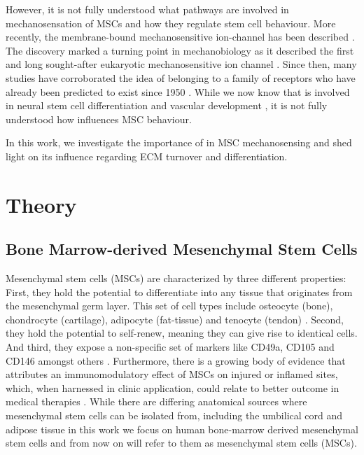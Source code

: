 However, it is not fully understood what pathways are involved in mechanosensation of MSCs and how they regulate stem cell behaviour. More recently, the membrane-bound mechanosensitive ion-channel \Piezo{} has been described \cite{Coste2010}. The discovery marked a turning point in mechanobiology as it described the first and long sought-after eukaryotic mechanosensitive ion channel \cite{Sharif-Naeini2015}. Since then, many studies have corroborated the idea of \Piezo{} belonging to a family of receptors who have already been predicted to exist since 1950 \cite{Katz1949}. While we now know that \Piezo{} is involved in neural stem cell differentiation \cite{Pathak2014} and vascular development \cite{Ranade2014}, it is not fully understood how \Piezo{} influences MSC behaviour. \par
In this work, we investigate the importance of \Piezo{} in MSC mechanosensing and shed light on its influence regarding ECM turnover and differentiation.

\section{Theory}

\subsection{Bone Marrow-derived Mesenchymal Stem Cells}

Mesenchymal stem cells (MSCs) are characterized by three different properties: First, they hold the potential to differentiate into any tissue that originates from the mesenchymal germ layer. This set of cell types include osteocyte (bone), chondrocyte (cartilage), adipocyte (fat-tissue) and tenocyte (tendon) \cite{Ng2008}. Second, they hold the potential to self-renew, meaning they can give rise to identical cells. And third, they expose a non-specific set of markers like CD49a, CD105 and CD146 amongst others \cite{Bianco2013}. Furthermore, there is a growing body of evidence that attributes an immunomodulatory effect of MSCs on injured or inflamed sites, which, when harnessed in clinic application, could relate to better outcome in medical therapies \cite{Caplan2011, Hass2011}.
While there are differing anatomical sources where mesenchymal stem cells can be isolated from, including the umbilical cord and adipose tissue \cite{Barlow2008, Hass2011} in this work we focus on human bone-marrow derived mesenchymal stem cells and from now on will refer to them as mesenchymal stem cells (MSCs). 


